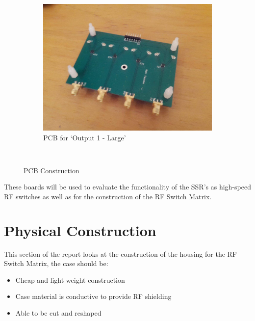 \documentclass[12pt,openany,a4paper]{book}
\begin{document}
\begin{figure}[H]
\begin{subfigure}[t]{0.5\textwidth}
        \includegraphics[width=1\textwidth]{pcb-output1.jpg}
        \caption{PCB for `Output 1 - Large'}
    \end{subfigure}
    ~
    \caption{PCB Construction}
    \label{fig:case}
\end{figure}
These boards will be used to evaluate the functionality of the SSR's as high-speed RF switches as well as for the construction of the RF Switch Matrix.




\section{Physical Construction}
This section of the report looks at the construction of the housing for the RF Switch Matrix, the case should be:
\vspace{-0.3cm}
\begin{itemize}
	\setlength\itemsep{-0.5em}
	\item Cheap and light-weight construction
	\item Case material is conductive to provide RF shielding
	\item Able to be cut and reshaped
\end{itemize}



\end{document}

